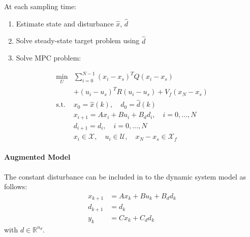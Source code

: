 At each sampling time:
\begin{enumerate}
    \item Estimate state and disturbance $\widehat{x}$, $\widehat{d}$
    \item Solve steady-state target problem using $\widehat{d}$
    \item Solve MPC problem:
\end{enumerate}
\begin{align*}
    \min_U       & \sum_{i=0}^{N-1} {(x_i - x_s)}^T Q (x_i - x_s)                                    \\
                 & + {(u_i - u_s)}^T R (u_i - u_s) + V_f(x_N - x_s)                                  \\
    \text{s.t. } & x_0 = \widehat{x}(k), \quad d_0 = \widehat{d}(k)                                  \\
                 & x_{i+1} = Ax_i + Bu_i + B_d d_i, \quad i = 0, \dots, N                            \\
                 & d_{i+1} = d_i, \quad i = 0, \dots, N                                              \\
                 & x_i \in \mathcal{X}, \quad u_i \in \mathcal{U}, \quad x_N - x_s \in \mathcal{X}_f
\end{align*}



\paragraph{Augmented Model}\label{const_dist}

The constant disturbance can be included in to the dynamic system model as follows:
\begin{align*}
    x_{k+1} & = Ax_k + Bu_k + B_d d_k \\
    d_{k+1} & = d_k                   \\
    y_k     & = Cx_k + C_d d_k
\end{align*}
with $d \in \mathbb{R}^{n_d}$.

